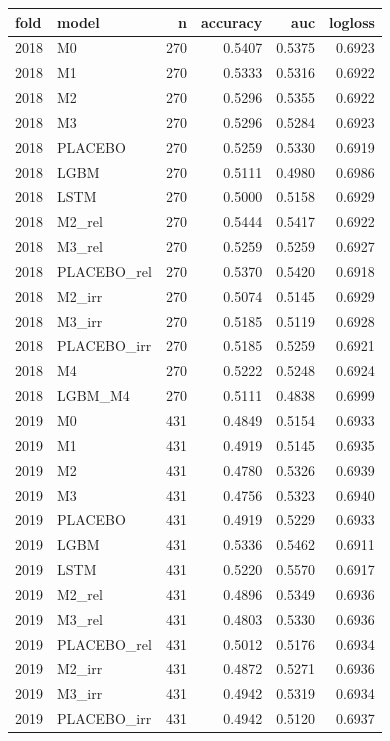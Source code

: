 \begin{tabular}{llrrrr}
\toprule
fold & model & n & accuracy & auc & logloss \\
\midrule
2018 & M0 & 270 & 0.5407 & 0.5375 & 0.6923 \\
2018 & M1 & 270 & 0.5333 & 0.5316 & 0.6922 \\
2018 & M2 & 270 & 0.5296 & 0.5355 & 0.6922 \\
2018 & M3 & 270 & 0.5296 & 0.5284 & 0.6923 \\
2018 & PLACEBO & 270 & 0.5259 & 0.5330 & 0.6919 \\
2018 & LGBM & 270 & 0.5111 & 0.4980 & 0.6986 \\
2018 & LSTM & 270 & 0.5000 & 0.5158 & 0.6929 \\
2018 & M2\_rel & 270 & 0.5444 & 0.5417 & 0.6922 \\
2018 & M3\_rel & 270 & 0.5259 & 0.5259 & 0.6927 \\
2018 & PLACEBO\_rel & 270 & 0.5370 & 0.5420 & 0.6918 \\
2018 & M2\_irr & 270 & 0.5074 & 0.5145 & 0.6929 \\
2018 & M3\_irr & 270 & 0.5185 & 0.5119 & 0.6928 \\
2018 & PLACEBO\_irr & 270 & 0.5185 & 0.5259 & 0.6921 \\
2018 & M4 & 270 & 0.5222 & 0.5248 & 0.6924 \\
2018 & LGBM\_M4 & 270 & 0.5111 & 0.4838 & 0.6999 \\
2019 & M0 & 431 & 0.4849 & 0.5154 & 0.6933 \\
2019 & M1 & 431 & 0.4919 & 0.5145 & 0.6935 \\
2019 & M2 & 431 & 0.4780 & 0.5326 & 0.6939 \\
2019 & M3 & 431 & 0.4756 & 0.5323 & 0.6940 \\
2019 & PLACEBO & 431 & 0.4919 & 0.5229 & 0.6933 \\
2019 & LGBM & 431 & 0.5336 & 0.5462 & 0.6911 \\
2019 & LSTM & 431 & 0.5220 & 0.5570 & 0.6917 \\
2019 & M2\_rel & 431 & 0.4896 & 0.5349 & 0.6936 \\
2019 & M3\_rel & 431 & 0.4803 & 0.5330 & 0.6936 \\
2019 & PLACEBO\_rel & 431 & 0.5012 & 0.5176 & 0.6934 \\
2019 & M2\_irr & 431 & 0.4872 & 0.5271 & 0.6936 \\
2019 & M3\_irr & 431 & 0.4942 & 0.5319 & 0.6934 \\
2019 & PLACEBO\_irr & 431 & 0.4942 & 0.5120 & 0.6937 \\

\end{tabular}
